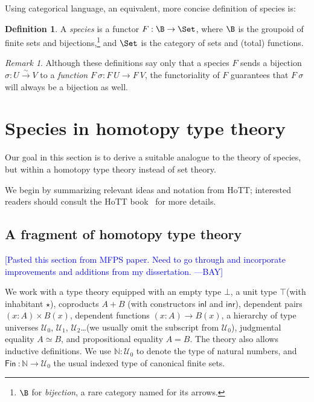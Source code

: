 \documentclass[preprint,authoryear]{sigplanconf}
\newcommand{\authornote}[3]{\textcolor{#1}{[#3 ---#2]}}
\newcommand{\authornote}[3]{}
\newcommand{\bay}[1]{\authornote{blue}{BAY}{#1}}
\newcommand{\term}[1]{\emph{#1}}
\newcommand{\bbb}[1]{\ensuremath{\mathbb{#1}}\xspace}
\providecommand{\N}{\bbb{N}}
\newcommand{\bij}{\stackrel{\sim}{\longrightarrow}}
\renewcommand{\equiv}{\simeq}         %
\theoremstyle{definition}
\newtheorem{defn}[thm]{Definition}
\theoremstyle{remark}
\newtheorem*{rem}{Remark}
\newcommand{\TyZero}{\ensuremath{\bot}\xspace}
\newcommand{\TyOne}{\ensuremath{\top}\xspace}
\newcommand{\unit}{\ensuremath{\star}\xspace}
\newcommand{\cons}[1]{\ensuremath{\mathsf{#1}}}
\newcommand{\inl}{\cons{inl}}
\newcommand{\inr}{\cons{inr}}
\newcommand{\Type}{\ensuremath{\mathcal{U}}}
\newcommand{\Fin}[1]{\ensuremath{\cons{Fin}\ #1}}
\begin{document}
Using categorical language, an equivalent, more
concise definition of species is:
\begin{defn}
  \label{defn:species-cat}
  A \term{species} is a functor $F : \B \to \Set$, where $\B$ is the
  groupoid of finite sets and bijections,\footnote{$\B$ for
    \emph{bijection}, a rare category named for its arrows.}  and
  $\Set$ is the category of sets and (total) functions.
\end{defn}

\begin{rem}
  Although these definitions say only that a species $F$ sends a bijection
  $\sigma : U \bij V$ to a \emph{function} $F\ \sigma : F\ U \to F\
  V$, the functoriality of $F$ guarantees that $F\ \sigma$
  will always be a bijection as well.
\end{rem}

\section{Species in homotopy type theory}
\label{sec:species-HoTT}

Our goal in this section is to derive a suitable analogue to the
theory of species, but within a homotopy type theory instead of
set theory.

We begin by summarizing relevant ideas and notation from HoTT;
interested readers should consult the HoTT book~\cite{hottbook} for
more details.

\subsection{A fragment of homotopy type theory}
\label{sec:HoTT}

\bay{Pasted this section from MFPS paper.  Need to go through and
  incorporate improvements and additions from my dissertation.}

We work with a type theory equipped with an empty type \TyZero, a unit
type \TyOne (with inhabitant $\unit$), coproducts $A + B$ (with
constructors $\inl$ and $\inr$), dependent pairs $(x:A) \times B(x)$,
dependent functions $(x:A) \to B(x)$, a hierarchy of type universes
$\Type_0$, $\Type_1$, $\Type_2$\dots (we usually omit the subscript
from $\Type_0$), judgmental equality $A \equiv B$, and propositional
equality $A = B$.  The theory also allows inductive definitions.  We
use $\N : \Type_0$ to denote the type of natural numbers, and $\Fin :
\N \to \Type_0$ the usual indexed type of canonical finite sets.
\end{document}
